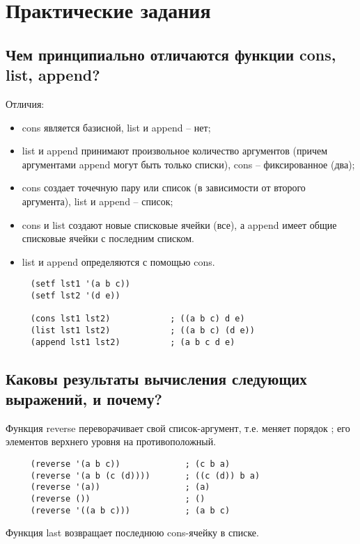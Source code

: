 \chapter{Практические задания}

\section{Чем принципиально отличаются функции cons, list, append?}

Отличия:
\begin{itemize}
    \item cons является базисной, list и append -- нет;
    \item  list и append принимают произвольное количество аргументов (причем аргументами append могут быть только списки), cons -- фиксированное (два);
    \item  cons создает точечную пару или список (в зависимости от второго аргумента), list и append -- список;
    \item cons и list создают новые списковые ячейки (все), а append имеет общие списковые ячейки с последним списком.
    \item list и append определяются с помощью cons.
\end{itemize}

\begin{lstlisting}
     (setf lst1 '(a b c)) 
     (setf lst2 '(d e))

     (cons lst1 lst2)            ; ((a b c) d e)  
     (list lst1 lst2)            ; ((a b c) (d e))
     (append lst1 lst2)          ; (a b c d e)  
\end{lstlisting}

\section{Каковы результаты вычисления следующих выражений, и почему?}

Функция reverse переворачивает свой список-аргумент, т.е. меняет порядок ; его элементов  верхнего уровня на противоположный.

\begin{lstlisting}
     (reverse '(a b c))             ; (c b a)
     (reverse '(a b (c (d))))       ; ((c (d)) b a)
     (reverse '(a))                 ; (a)
     (reverse ())                   ; ()
     (reverse '((a b c)))           ; (a b c)
\end{lstlisting}

Функция last возвращает последнюю cons-ячейку в списке.

